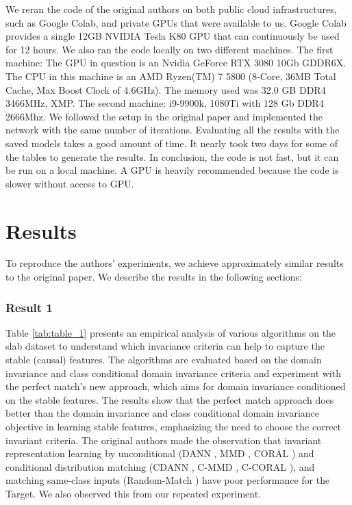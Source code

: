 We reran the code of the original authors on both public cloud infrastructures, such as Google Colab, and private GPUs that were available to us. Google Colab provides a single 12GB NVIDIA Tesla K80 GPU that can continuously be used for 12 hours. We also ran the code locally on two different machines. The first machine: The GPU in question is an Nvidia GeForce RTX 3080 10Gb GDDR6X. The CPU in this machine is an AMD Ryzen(TM) 7 5800 (8-Core, 36MB Total Cache, Max Boost Clock of 4.6GHz). The memory used was 32.0 GB DDR4 3466MHz, XMP. The second machine: i9-9900k, 1080Ti with 128 Gb DDR4 2666Mhz. We followed the setup in the original paper and implemented the network with the same number of iterations. Evaluating all the results with the saved models takes a good amount of time. It nearly took two days for some of the tables to generate the results. In conclusion, the code is not fast, but it can be run on a local machine. A GPU is heavily recommended because the code is slower without access to GPU.

\section{Results}

To reproduce the authors' experiments, we achieve approximately similar results to the original paper. We describe the results in the following sections:

\subsubsection{Result 1}

Table \ref{tab:table_1} presents an empirical analysis of various algorithms on the slab dataset to understand which invariance criteria can help to capture the stable (causal) features. The algorithms are evaluated based on the domain invariance and class conditional domain invariance criteria and experiment with the perfect match's new approach, which aims for domain invariance conditioned on the stable features. The results show that the perfect match approach does better than the domain invariance and class conditional domain invariance objective in learning stable features, emphasizing the need to choose the correct invariant criteria. The original authors made the observation that invariant representation learning by unconditional (DANN \cite{ganin2016domain}, MMD \cite{li2018domain}, CORAL \cite{sun2016deep}) and conditional distribution matching (CDANN \cite{li2018deep}, C-MMD \cite{li2018domain}, C-CORAL \cite{sun2016deep}), and matching same-class inputs (Random-Match \cite{motiian2017unified}) have poor performance for the Target. We also observed this from our repeated experiment.

